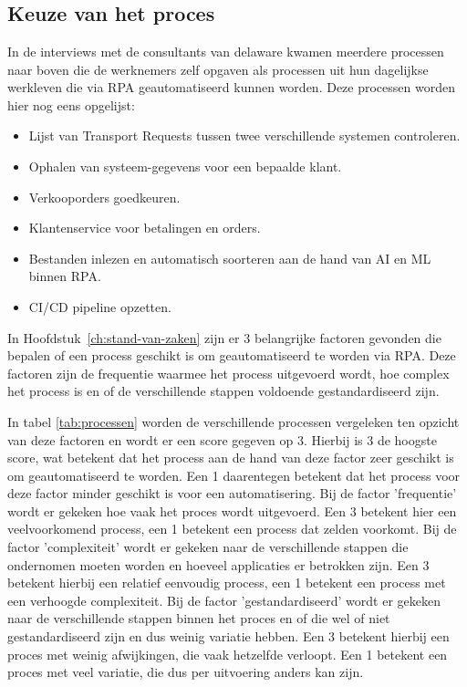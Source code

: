 \chapter{}%
\label{ch:proofOfConcept}

\section{Keuze van het proces}
\label{sec:keuze-proces}

In de interviews met de consultants van delaware kwamen meerdere processen naar boven die de werknemers zelf opgaven als processen uit hun dagelijkse werkleven die via RPA geautomatiseerd kunnen worden.
Deze processen worden hier nog eens opgelijst:

\begin{itemize}
    \item Lijst van Transport Requests tussen twee verschillende systemen controleren.
    \item Ophalen van systeem-gegevens voor een bepaalde klant.
    \item Verkooporders goedkeuren.
    \item Klantenservice voor betalingen en orders.
    \item Bestanden inlezen en automatisch soorteren aan de hand van AI en ML binnen RPA.
    \item CI/CD pipeline opzetten.
\end{itemize}

In Hoofdstuk~\ref{ch:stand-van-zaken} zijn er 3 belangrijke factoren gevonden die bepalen of een process geschikt is om geautomatiseerd te worden via RPA. Deze factoren zijn de frequentie waarmee het process uitgevoerd wordt, hoe complex het process is en of de verschillende stappen voldoende gestandardiseerd zijn.

In tabel \ref{tab:processen} worden de verschillende processen vergeleken ten opzicht van deze factoren en wordt er een score gegeven op 3. Hierbij is 3 de hoogste score, wat betekent dat het process aan de hand van deze factor zeer geschikt is om geautomatiseerd te worden. Een 1 daarentegen betekent dat het process voor deze factor minder geschikt is voor een automatisering.
Bij de factor 'frequentie' wordt er gekeken hoe vaak het proces wordt uitgevoerd. Een 3 betekent hier een veelvoorkomend process, een 1 betekent een process dat zelden voorkomt.
Bij de factor 'complexiteit' wordt er gekeken naar de verschillende stappen die ondernomen moeten worden en hoeveel applicaties er betrokken zijn. Een 3 betekent hierbij een relatief eenvoudig process, een 1 betekent een process met een verhoogde complexiteit.
Bij de factor 'gestandardiseerd' wordt er gekeken naar de verschillende stappen binnen het proces en of die wel of niet gestandardiseerd zijn en dus weinig variatie hebben. Een 3 betekent hierbij een proces met weinig afwijkingen, die vaak hetzelfde verloopt. Een 1 betekent een proces met veel variatie, die dus per uitvoering anders kan zijn.

